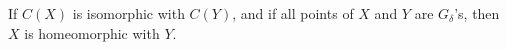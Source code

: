 If $C(X)$ is isomorphic with $C(Y)$, and if all points of $X$ and $Y$ are $G_\delta$'s, then $X$ is homeomorphic with $Y$.

